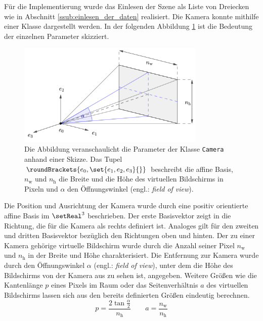 \documentclass[crop=false]{standalone}
\begin{document}
      Für die Implementierung wurde das Einlesen der Szene als Liste von Dreiecken wie in Abschnitt \ref{ssub:einlesen_der_daten} realisiert.
      Die Kamera konnte mithilfe einer Klasse dargestellt werden.
      In der folgenden Abbildung \ref{fig:camera-scheme} ist die Bedeutung der einzelnen Parameter skizziert.
      \begin{figure}
        \center
        \includegraphics[width=0.8\textwidth]{images/camera_scheme.pdf}
        \caption{%
          Die Abbildung veranschaulicht die Parameter der Klasse \texttt{Camera} anhand einer Skizze.
          Das Tupel $\roundBrackets{e_0,\set{e_1,e_2,e_3}{}}$ beschreibt die affine Basis, $n_\mathrm{w}$ und $n_\mathrm{h}$ die Breite und die Höhe des virtuellen Bildschirms in Pixeln und $α$ den Öffnungswinkel (engl.: \textit{field of view}).
        }
        \label{fig:camera-scheme}
      \end{figure}
      Die Position und Ausrichtung der Kamera wurde durch eine positiv orientierte affine Basis im $\setReal^3$ beschrieben.
      Der erste Basisvektor zeigt in die Richtung, die für die Kamera als rechts definiert ist.
      Analoges gilt für den zweiten und dritten Basisvektor bezüglich den Richtungen oben und hinten.
      Der zu einer Kamera gehörige virtuelle Bildschirm wurde durch die Anzahl seiner Pixel $n_\mathrm{w}$ und $n_\mathrm{h}$ in der Breite und Höhe charakterisiert.
      Die Entfernung zur Kamera wurde durch den Öffnungswinkel $\alpha$ (engl.: \textit{field of view}), unter dem die Höhe des Bildschirms von der Kamera aus zu sehen ist, angegeben.
      Weitere Größen wie die Kantenlänge $p$ eines Pixels im Raum oder das Seitenverhältnis $a$ des virtuellen Bildschirms lassen sich aus den bereits definierten Größen eindeutig berechnen.
      \[
        p = \frac{2\tan \frac{\alpha}{2}}{n_\mathrm{h}}
        \qquad
        a = \frac{n_\mathrm{w}}{n_\mathrm{h}}
      \]
\end{document}

